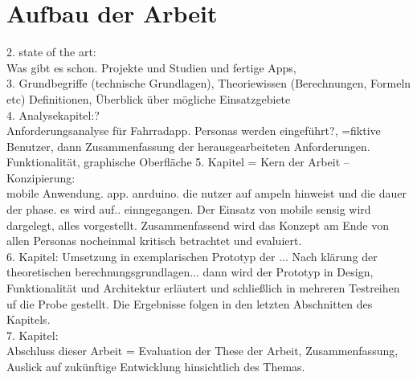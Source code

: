 \section{Aufbau der Arbeit}
2. state of the art:\\
Was gibt es schon. Projekte und Studien und fertige Apps,\\ 
3. Grundbegriffe (technische Grundlagen), Theoriewissen (Berechnungen, Formeln etc) Definitionen, Überblick über mögliche Einsatzgebiete \\
4. Analysekapitel:?\\
Anforderungsanalyse für Fahrradapp. Personas werden eingeführt?, =fiktive Benutzer, dann Zusammenfassung der herausgearbeiteten Anforderungen.\\
Funktionalität, graphische Oberfläche
5. Kapitel = Kern der Arbeit -- Konzipierung:\\
mobile Anwendung. app. anrduino. die nutzer auf ampeln hinweist und die dauer der phase. 
es wird auf.. einngegangen. Der Einsatz von mobile sensig wird dargelegt, alles vorgestellt. Zusammenfassend wird das Konzept am Ende von allen Personas nocheinmal kritisch betrachtet und evaluiert.\\
6. Kapitel: Umsetzung in exemplarischen Prototyp der ... Nach klärung der theoretischen berechnungsgrundlagen... dann wird der Prototyp in Design, Funktionalität und Architektur erläutert und schließlich in mehreren Testreihen uf die Probe gestellt. Die Ergebnisse folgen in den letzten Abschnitten des Kapitels.\\
7. Kapitel: \\
Abschluss dieser Arbeit = Evaluation der These der Arbeit, Zusammenfassung, Auslick auf zukünftige Entwicklung hinsichtlich des Themas.
